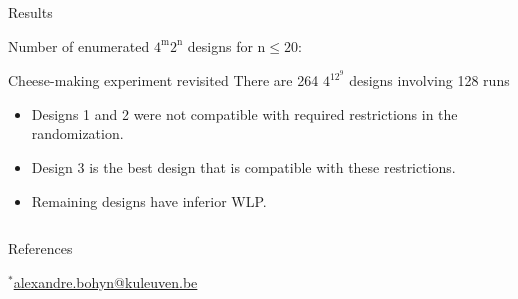 \documentclass{beamer}
\begin{document}
\begin{frame}[t]
\begin{columns}[t]
\begin{column}{.49\textwidth}
	{\color{kul-blue} \sffamily \large Results}
	
	Number of enumerated $\mathrm{4^m2^n}$ designs for $\mathrm{n \leq 20}$:
	
	
	
	\vspace{24pt}
	
	\begin{exampleblock}{\color{kul-blue} \sffamily \large Cheese-making experiment revisited}
	There are 264 $\mathrm{4^12^9}$ designs involving 128 runs

	

	\begin{itemize}
	    \item Designs 1 and 2 were not compatible with required restrictions in the randomization.
	    \item Design 3 is the best design that is compatible with these restrictions.
	    \item Remaining designs have inferior WLP.
	\end{itemize}
    \end{exampleblock}
	\end{column}
	
\end{columns}
    
    \begin{columns}
    \begin{column}{1.07\textwidth}
    \begin{block}{\color{kul-blue} \sffamily \large References}
	\scriptsize
	
	
	\end{block}
	\hfill 
	$^{*}$\href{mailto:alexandre.bohyn@kuleuven.be}{alexandre.bohyn@kuleuven.be}
	\end{column}
	\end{columns}
    
\end{frame}
\end{document}
